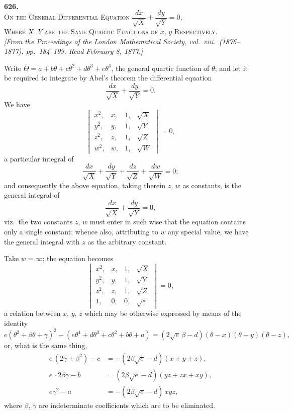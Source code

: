 \documentclass[11pt]{article}
\begin{document}

\bigskip\bigskip
\begin{center}
{\Large\bfseries 626.}\\[2pt]
{\large\scshape On the General Differential Equation $\dfrac{dx}{\sqrt{X}} + \dfrac{dy}{\sqrt{Y}} = 0$,}\\[2pt]
{\large\scshape Where $X$, $Y$ are the Same Quartic Functions of $x$, $y$ Respectively.}\\[6pt]
\textit{[From the Proceedings of the London Mathematical Society, vol.~viii.\ (1876--1877), pp.~184--199. Read February 8, 1877.]}
\end{center}

\bigskip

Write $\Theta = a + b\theta + c\theta^2 + d\theta^3 + e\theta^4$, the general quartic function of $\theta$; and let it be required to integrate by Abel's theorem the differential equation
\[
\dfrac{dx}{\sqrt{X}} + \dfrac{dy}{\sqrt{Y}} = 0.
\]
We have
\[
\begin{vmatrix} x^2,& x,& 1,& \sqrt{X}\\ y^2,& y,& 1,& \sqrt{Y}\\ z^2,& z,& 1,& \sqrt{Z}\\ w^2,& w,& 1,& \sqrt{W} \end{vmatrix} = 0,
\]
a particular integral of
\[
\dfrac{dx}{\sqrt{X}} + \dfrac{dy}{\sqrt{Y}} + \dfrac{dz}{\sqrt{Z}} + \dfrac{dw}{\sqrt{W}} = 0;
\]
and consequently the above equation, taking therein $z$, $w$ as constants, is the general integral of
\[
\dfrac{dx}{\sqrt{X}} + \dfrac{dy}{\sqrt{Y}} = 0,
\]
viz.\ the two constants $z$, $w$ must enter in such wise that the equation contains only a single constant; whence also, attributing to $w$ any special value, we have the general integral with $z$ as the arbitrary constant.

Take $w = \infty$; the equation becomes
\[
\begin{vmatrix} x^2,& x,& 1,& \sqrt{X}\\ y^2,& y,& 1,& \sqrt{Y}\\ z^2,& z,& 1,& \sqrt{Z}\\ 1,& 0,& 0,& \sqrt{e} \end{vmatrix} = 0,
\]
a relation between $x$, $y$, $z$ which may be otherwise expressed by means of the identity
\[
e(\theta^2 + \beta\theta + \gamma)^2 - (e\theta^4 + d\theta^3 + c\theta^2 + b\theta + a) = (2\sqrt{e}\,\beta - d)(\theta - x)(\theta - y)(\theta - z),
\]
or, what is the same thing,
\begin{align*}
e\,(2\gamma + \beta^2) - c &= -(2\beta\sqrt{e} - d)(x + y + z),\\
e\,\cdot 2\beta\gamma - b &= (2\beta\sqrt{e} - d)(yz + zx + xy),\\
e\gamma^2 - a &= -(2\beta\sqrt{e} - d)\,xyz,
\end{align*}
where $\beta$, $\gamma$ are indeterminate coefficients which are to be eliminated.
\end{document}
